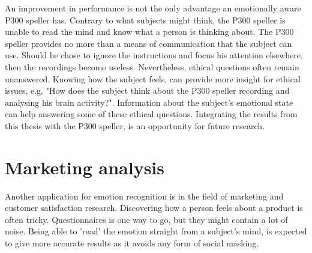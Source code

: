 \npar

An improvement in performance is not the only advantage an emotionally aware P300 speller has. Contrary to what subjects might think, the P300 speller is unable to read the mind and know what a person is thinking about\cite{P300Origin}. The P300 speller provides no more than a means of communication that the subject can use. Should he chose to ignore the instructions and focus his attention elsewhere, then the recordings become useless. Nevertheless, ethical questions often remain unanswered. Knowing how the subject feels, can provide more insight for ethical issues, e.g. "How does the subject think about the P300 speller recording and analysing his brain activity?". Information about the subject's emotional state can help answering some of these ethical questions. Integrating the results from this thesis with the P300 speller, is an opportunity for future research.

\section{Marketing analysis}
Another application for emotion recognition is in the field of marketing and customer satisfaction research. Discovering how a person feels about a product is often tricky. Questionnaires is one way to go, but they might contain a lot of noise. Being able to 'read' the emotion straight from a subject's mind, is expected to give more accurate results as it avoids any form of social masking. %
